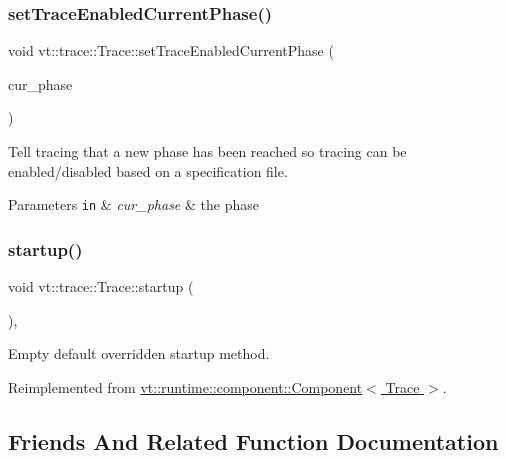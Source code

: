 \subsubsection{\texorpdfstring{set\+Trace\+Enabled\+Current\+Phase()}{setTraceEnabledCurrentPhase()}}
{\footnotesize\ttfamily void vt\+::trace\+::\+Trace\+::set\+Trace\+Enabled\+Current\+Phase (\begin{DoxyParamCaption}\item[{\hyperlink{namespacevt_a46ce6733d5cdbd735d561b7b4029f6d7}{Phase\+Type}}]{cur\+\_\+phase }\end{DoxyParamCaption})}



Tell tracing that a new phase has been reached so tracing can be enabled/disabled based on a specification file. 


\begin{DoxyParams}[1]{Parameters}
\mbox{\tt in}  & {\em cur\+\_\+phase} & the phase \\
\hline
\end{DoxyParams}
\mbox{\label{structvt_1_1trace_1_1_trace_a5dd8767d9020ebeaba49ea3a684738a1}} 
\subsubsection{\texorpdfstring{startup()}{startup()}}
{\footnotesize\ttfamily void vt\+::trace\+::\+Trace\+::startup (\begin{DoxyParamCaption}{ }\end{DoxyParamCaption})\hspace{0.3cm}{\ttfamily [override]}, {\ttfamily [virtual]}}



Empty default overridden startup method. 



Reimplemented from \hyperlink{structvt_1_1runtime_1_1component_1_1_component_aad3974307ab3b2e1df389a91310f68c2}{vt\+::runtime\+::component\+::\+Component$<$ Trace $>$}.



\subsection{Friends And Related Function Documentation}
\mbox{\label{structvt_1_1trace_1_1_trace_a17caa1eeb27fd6a4af8786a7f0679d77}} 
